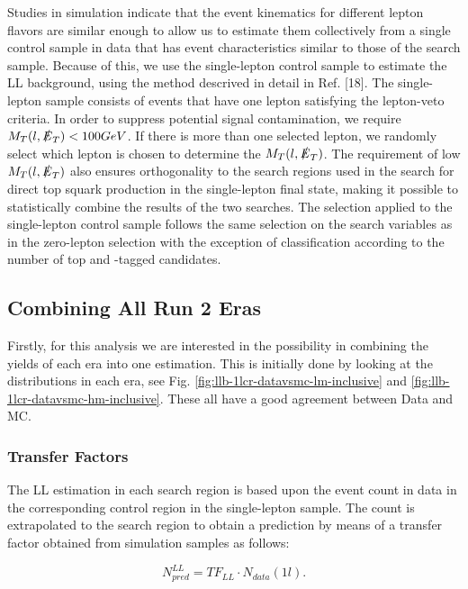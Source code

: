 Studies in simulation indicate that the event kinematics for different lepton flavors are similar enough to allow us to estimate them collectively from a single control sample in data that has event characteristics similar to those of the search sample. Because of this, we use the single-lepton control sample to estimate the LL background, using the method descrived in detail in Ref. [18]. The single-lepton sample consists of events that have one lepton satisfying the lepton-veto criteria. In order to suppress potential signal contamination, we require $M_T(l,\slashed{E}_{T})<100 GeV$. If there is more than one selected lepton, we randomly select which lepton is chosen to determine the $M_T(l,\slashed{E}_{T})$. The requirement of low $M_T(l,\slashed{E}_{T})$ also ensures orthogonality to the search regions used in the search for direct top squark production in the single-lepton final state, making it possible to statistically combine the results of the two searches. The selection applied to the single-lepton control sample follows the same selection on the search variables as in the zero-lepton selection with the exception of classification according to the number of top and \W-tagged candidates. 

\subsection{Combining All Run 2 Eras}\label{sec:LLCombination}
Firstly, for this analysis we are interested in the possibility in combining the yields of each era into one estimation. This is initially done by looking at the \met{} distributions in each era, see Fig. \ref{fig:llb-1lcr-datavsmc-lm-inclusive} and \ref{fig:llb-1lcr-datavsmc-hm-inclusive}. These all have a good agreement between Data and MC. 


\subsubsection{Transfer Factors}
\label{subsec:TF}

The LL estimation in each search region is based upon the event count in data in the corresponding control region in the single-lepton sample. The count is extrapolated to the search region to obtain a prediction by means of a transfer factor obtained from simulation samples as follows: 

\begin{equation}
\label{eqn:LLTF}
N_{pred}^{LL}=TF_{LL} \cdot N_{data}(1l).
\end{equation}

